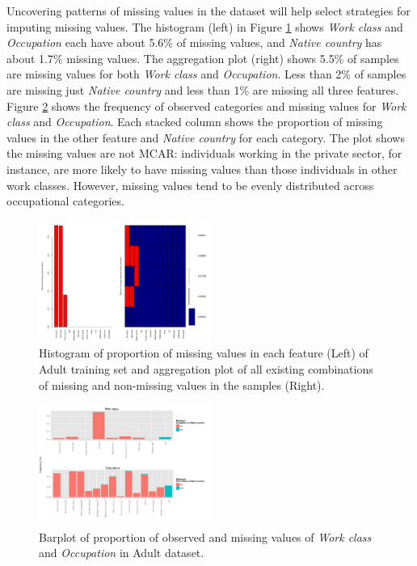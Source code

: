 \documentclass[10pt,twocolumn,letterpaper]{article}
\begin{document}
Uncovering patterns of missing values in the dataset will help select strategies for imputing missing values. The histogram (left) in Figure \ref{fig:proportion-missing} shows \textit{Work class} and \textit{Occupation} each have about 5.6\% of missing values, and \textit{Native country} has about 1.7\% missing values. The aggregation plot (right) shows 5.5\% of samples are missing values for both \textit{Work class} and \textit{Occupation}. Less than 2\% of samples are missing just \textit{Native country} and less than 1\% are missing all three features.\\

Figure \ref{fig:barplot-missing} shows the frequency of observed categories and missing values for \textit{Work class} and \textit{Occupation}. Each stacked column shows the proportion of missing values in the other feature and \textit{Native country} for each category. The plot shows the missing values are not MCAR: individuals working in the private sector, for instance, are more likely to have missing values than those individuals in other work classes. However, missing values tend to be evenly distributed across occupational categories. 

\begin{figure}[htbp] 
   \centering
   \includegraphics[width=0.5\textwidth]{./figure/proportion-missing.pdf}
   \caption{Histogram of proportion of missing values in each feature (Left) of Adult training set and aggregation plot of all existing combinations of missing and non-missing values in the samples (Right).}
   \label{fig:proportion-missing}
\end{figure}

\begin{figure}[htbp] 
   \centering
   \includegraphics[width=0.5\textwidth]{./figure/barplot-missing.pdf}
   \caption{Barplot of proportion of observed and missing values of \textit{Work class} and \textit{Occupation} in Adult dataset.}
   \label{fig:barplot-missing}
\end{figure}
\end{document}
